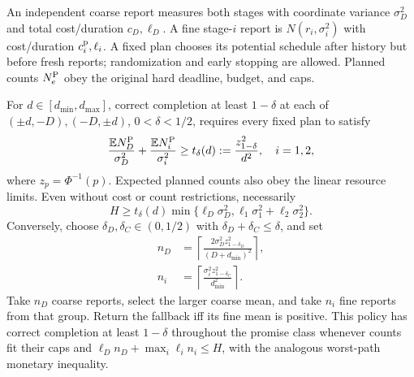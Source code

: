 An independent coarse report measures both stages with coordinate variance $\sigma_D^2$ and total cost/duration $c_D,\ell_D$. A fine stage-$i$ report is $N(r_i,\sigma_i^2)$ with cost/duration $c_i^{\rm p},\ell_i$. A fixed plan chooses its potential schedule after history but before fresh reports; randomization and early stopping are allowed. Planned counts $N_e^{\rm P}$ obey the original hard deadline, budget, and caps.

\begin{proposition}
\label{prop:adaptive-separation}
For $d\in[d_{\min},d_{\max}]$, correct completion at least $1-\delta$
at each of $(\pm d,-D),(-D,\pm d)$, $0<\delta<1/2$, requires every fixed
plan to satisfy
\begin{equation}
 \frac{\mathbb E N_D^{\rm P}}{\sigma_D^2}
 +\frac{\mathbb E N_i^{\rm P}}{\sigma_i^2}
 \geq t_\delta(d):=\frac{z_{1-\delta}^2}{d^2},\quad i=1,2,
 \label{eq:fixed-plan-necessity}
\end{equation}
where $z_p=\Phi^{-1}(p)$. Expected planned counts also obey the linear
resource limits. Even without cost or count restrictions, necessarily
\begin{equation}
 H\geq t_\delta(d)\min\{\ell_D\sigma_D^2,
 \ell_1\sigma_1^2+\ell_2\sigma_2^2\}.
 \label{eq:fixed-plan-time}
\end{equation}
Conversely, choose $\delta_D,\delta_C\in(0,1/2)$ with
$\delta_D+\delta_C\leq\delta$, and set
\begin{align}
 n_D&=\left\lceil\frac{2\sigma_D^2z_{1-\delta_D}^2}
 {(D+d_{\min})^2}\right\rceil,\nonumber\\
 n_i&=\left\lceil\frac{\sigma_i^2z_{1-\delta_C}^2}{d_{\min}^2}
 \right\rceil.
 \label{eq:adaptive-counts}
\end{align}
Take $n_D$ coarse reports, select the larger coarse mean, and take $n_i$
fine reports from that group. Return the fallback iff its fine mean is
positive. This policy has correct completion at least $1-\delta$
throughout the promise class whenever counts fit their caps and
$\ell_Dn_D+\max_i\ell_i n_i\leq H$, with the analogous worst-path
monetary inequality.
\end{proposition}

